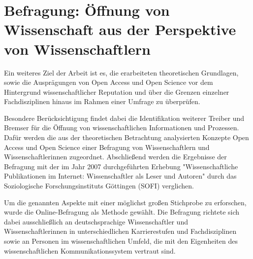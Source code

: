 \chapter{Befragung: Öffnung von Wissenschaft aus der Perspektive von Wissenschaftlern}

Ein weiteres Ziel der Arbeit ist es, die erarbeiteten theoretischen Grundlagen, sowie die Ausprägungen von Open Access und Open Science vor dem Hintergrund wissenschaftlicher Reputation und über die Grenzen einzelner Fachdisziplinen hinaus im Rahmen einer Umfrage zu überprüfen.

Besondere Berücksichtigung findet dabei die Identifikation weiterer Treiber und Bremser für die Öffnung von wissenschaftlichen Informationen und Prozessen. Dafür werden die aus der theoretischen Betrachtung analysierten Konzepte Open Access und Open Science einer Befragung von Wissenschaftlern und Wissenschaftlerinnen zugeordnet. Abschließend werden die Ergebnisse der Befragung mit der im Jahr 2007 durchgeführten Erhebung "Wissenschaftliche Publikationen im Internet: Wissenschaftler als Leser und Autoren" durch das Soziologische Forschungsinstituts Göttingen (SOFI) verglichen.

Um die genannten Aspekte mit einer möglichst großen Stichprobe zu erforschen, wurde die Online-Befragung als Methode gewählt. Die Befragung richtete sich dabei ausschließlich an deutschsprachige Wissenschaftler und Wissenschaftlerinnen in unterschiedlichen Karrierestufen und Fachdisziplinen sowie an Personen im wissenschaftlichen Umfeld, die mit den Eigenheiten des wissenschaftlichen Kommunikationssystem vertraut sind.

